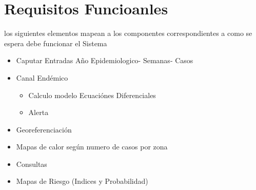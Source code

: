 \chapter{Requisitos Funcioanles}


los siguientes elementos mapean a los componentes  correspondientes a como se espera debe funcionar el Sistema

\begin{itemize}
	\item Caputar Entradas Año Epidemiologico- Semanas- Casos
	\item Canal Endémico
		\begin{itemize}
			\item Calculo modelo Ecuaciónes Diferenciales
			\item Alerta 
		\end{itemize}
	\item Georeferenciación
	\item Mapas de calor según numero de casos por zona
	\item Consultas

	\item Mapas de Riesgo (Indices y Probabilidad)

\end{itemize}
